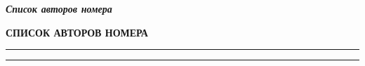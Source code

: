 \newpage
\thispagestyle{empty}

 {{\footnotesize{{\it \textbf{
Список авторов номера }}}}}


\parindent=0pt

\begin{center}
{\sf \textbf{СПИСОК АВТОРОВ НОМЕРА}}
\end{center}
\vskip 2pt \hrule height 1pt \vskip 2pt \hrule \vskip 0.5cm

\def\authorInfo#1#2#3#4{
    \medskip
    {\def\arraystretch{0.1}
    \begin{tabular}{p{5.2cm}p{10.5cm}}
        \emph{\textbf{#1}} \par \emph{\textbf{#2}} & #3
        \par \ifthenelse{\equal{#4}{}}{}{\textit{e-mail: #4}}
    \end{tabular}}
}
